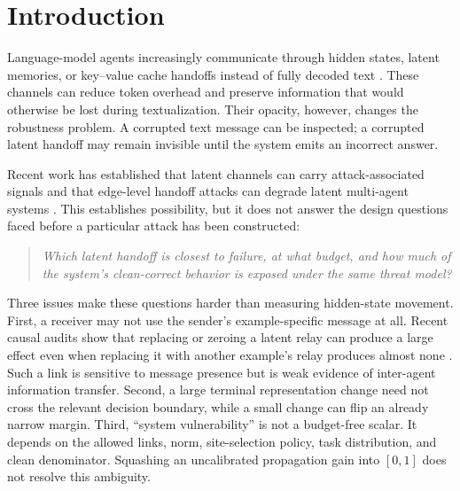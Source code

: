\documentclass[11pt]{article}
\begin{document}
\begin{abstract}
On an exploratory, fixed execution-order prefix of six validation examples
(18 example--handoff units), the empirical radius achieved a realized-norm
crossed-threshold Spearman correlation of 0.750 and interval-censored
concordance of 0.740 under per-example PGD. The corresponding values were
0.316 and 0.753 for clean margin alone, and 0.600 and 0.523 for susceptibility
alone. Thus the preliminary evidence supports useful boundary ordering but not
uniform superiority to clean margin. Held-out test evaluation, transfer
attacks, system profiling, and protection experiments remain unobserved and
are required for confirmatory claims.
\end{abstract}

\section{Introduction}

Language-model agents increasingly communicate through hidden states, latent
memories, or key--value cache handoffs instead of fully decoded text
\cite{du2025interlat,zou2025latentmas,yang2026recursivemas}. These channels can
reduce token overhead and preserve information that would otherwise be lost
during textualization. Their opacity, however, changes the robustness problem.
A corrupted text message can be inspected; a corrupted latent handoff may
remain invisible until the system emits an incorrect answer.

Recent work has established that latent channels can carry attack-associated
signals and that edge-level handoff attacks can degrade latent multi-agent
systems \cite{wang2026outofsight,brito2026latentagents}. This establishes
possibility, but it does not answer the design questions faced before a
particular attack has been constructed:
\begin{quote}
\emph{Which latent handoff is closest to failure, at what budget, and how much
of the system's clean-correct behavior is exposed under the same threat model?}
\end{quote}

Three issues make these questions harder than measuring hidden-state movement.
First, a receiver may not use the sender's example-specific message at all.
Recent causal audits show that replacing or zeroing a latent relay can produce
a large effect even when replacing it with another example's relay produces
almost none \cite{cheng2026when,zhang2026channels}. Such a link is sensitive
to message presence but is weak evidence of inter-agent information transfer.
Second, a large terminal representation change need not cross the relevant
decision boundary, while a small change can flip an already narrow margin.
Third, ``system vulnerability'' is not a budget-free scalar. It depends on the
allowed links, norm, site-selection policy, task distribution, and clean
denominator. Squashing an uncalibrated propagation gain into \([0,1]\) does not
resolve this ambiguity.
\end{document}
